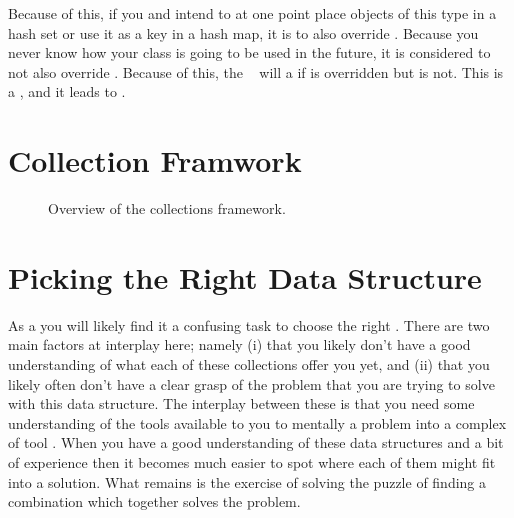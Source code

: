 Because of this, if you   and intend to at one point place objects of this type in a hash set or use it as a key in a hash map, it is  to also override . Because you never know how your class is going to be used in the future, it is considered  to not also override . Because of this, the \csharp\  will  a  if  is overridden but  is not. This is a , and  it leads to   .

\section{Collection Framwork}
\label{sec:collections:framework}


\begin{figure}[tbp]
  
  \caption{Overview of the collections framework.}
  \label{fig:collections:framework}
\end{figure}


\section{Picking the Right Data Structure}

As a  you will likely find it a confusing task to choose the right . There are two main factors at interplay here; namely (i) that you likely don't have a good understanding of what each of these collections offer you yet, and (ii) that you likely often don't have a clear grasp of the problem that you are trying to solve with this data structure. The interplay between these is that you need some understanding of the tools available to you to mentally  a problem into a complex of tool . When you have a good understanding of these data structures and a bit of experience then it becomes much easier to spot where each of them might fit into a solution. What remains is the exercise of solving the puzzle of finding a combination which together solves the problem.

